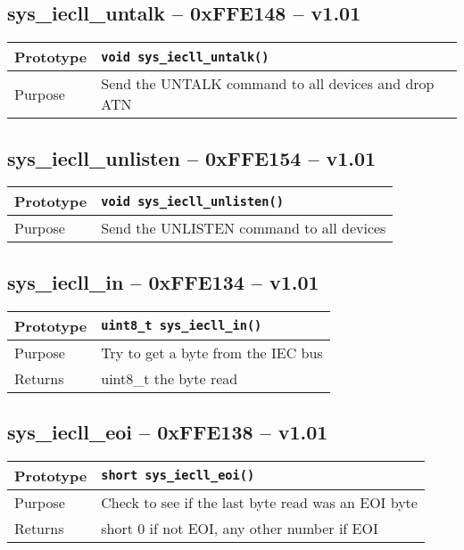 \subsection*{sys\_iecll\_untalk -- 0xFFE148 -- v1.01}
\begin{table}[!h]\begin{tabular}{|l||l|} \hline
Prototype & \lstinline!void sys_iecll_untalk()! \\ \hline
Purpose & Send the UNTALK command to all devices and drop ATN \\ \hline
\end{tabular}\end{table}

\subsection*{sys\_iecll\_unlisten -- 0xFFE154 -- v1.01}
\begin{table}[!h]\begin{tabular}{|l||l|} \hline
Prototype & \lstinline!void sys_iecll_unlisten()! \\ \hline
Purpose & Send the UNLISTEN command to all devices \\ \hline
\end{tabular}\end{table}

\subsection*{sys\_iecll\_in -- 0xFFE134 -- v1.01}
\begin{table}[!h]\begin{tabular}{|l||l|} \hline
Prototype & \lstinline!uint8_t sys_iecll_in()! \\ \hline
Purpose & Try to get a byte from the IEC bus \\ \hline
Returns & uint8\_t the byte read \\ \hline
\end{tabular}\end{table}

\subsection*{sys\_iecll\_eoi -- 0xFFE138 -- v1.01}
\begin{table}[!h]\begin{tabular}{|l||l|} \hline
Prototype & \lstinline!short sys_iecll_eoi()! \\ \hline
Purpose & Check to see if the last byte read was an EOI byte \\ \hline
Returns & short 0 if not EOI, any other number if EOI \\ \hline
\end{tabular}\end{table}

